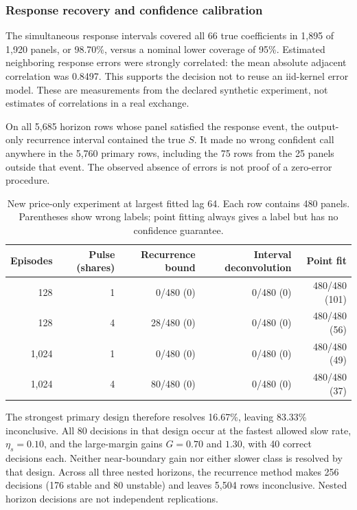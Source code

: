\documentclass[10pt,twocolumn,letterpaper]{article}
\theoremstyle{definition}
\theoremstyle{remark}
\begin{document}
\subsubsection{Response recovery and confidence calibration}
The simultaneous response intervals covered all 66 true coefficients in 1,895 of 1,920 panels, or 98.70\%, versus a nominal lower coverage of 95\%. Estimated neighboring response errors were strongly correlated: the mean absolute adjacent correlation was 0.8497. This supports the decision not to reuse an iid-kernel error model. These are measurements from the declared synthetic experiment, not estimates of correlations in a real exchange.

On all 5,685 horizon rows whose panel satisfied the response event, the output-only recurrence interval contained the true $S$. It made no wrong confident call anywhere in the 5,760 primary rows, including the 75 rows from the 25 panels outside that event. The observed absence of errors is not proof of a zero-error procedure.

\begin{table}[htbp]
\centering\small
\caption{New price-only experiment at largest fitted lag 64. Each row contains 480 panels. Parentheses show wrong labels; point fitting always gives a label but has no confidence guarantee.}
\label{tab:observable_primary}
\begin{tabular}{rr rrr}\toprule
Episodes & Pulse (shares) & Recurrence bound & Interval deconvolution & Point fit\\\midrule
128 & 1 & 0/480 (0) & 0/480 (0) & 480/480 (101)\\
128 & 4 & 28/480 (0) & 0/480 (0) & 480/480 (56)\\
1,024 & 1 & 0/480 (0) & 0/480 (0) & 480/480 (49)\\
1,024 & 4 & 80/480 (0) & 0/480 (0) & 480/480 (37)\\\bottomrule
\end{tabular}
\end{table}

The strongest primary design therefore resolves 16.67\%, leaving 83.33\% inconclusive. All 80 decisions in that design occur at the fastest allowed slow rate, $\eta_s=0.10$, and the large-margin gains $G=0.70$ and $1.30$, with 40 correct decisions each. Neither near-boundary gain nor either slower class is resolved by that design. Across all three nested horizons, the recurrence method makes 256 decisions (176 stable and 80 unstable) and leaves 5,504 rows inconclusive. Nested horizon decisions are not independent replications.
\end{document}
